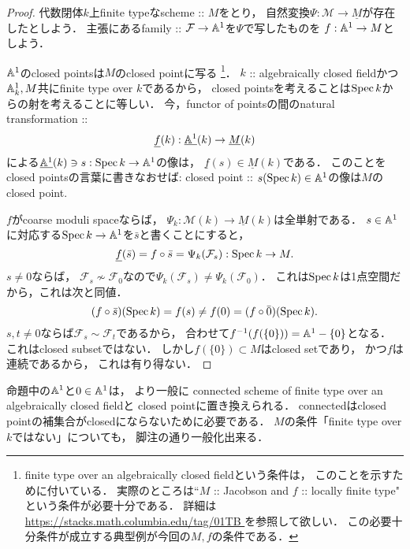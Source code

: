 \documentclass[a4paper]{jsarticle}
\newcommand{\famF}{\mathcal{F}}
\newcommand{\ftor}[1]{\underline{#1}}
\newcommand{\ftorM}{\mathcal{M}}
\begin{document}
    \begin{proof}
        代数閉体$k$上finite typeなscheme :: $M$をとり，
        自然変換$\Psi: \ftorM \to \ftor{M}$が存在したとしよう．
        主張にあるfamily :: $\famF \to \affine^1$を$\Psi$で写したものを
        $f: \mathbb{A}^1 \to M$としよう．

        $\mathbb{A}^1$のclosed pointsは$M$のclosed pointに写る
        \footnote
        {
            finite type over an algebraically closed fieldという条件は，
            このことを示すために付いている．
            実際のところは``$M$ :: Jacobson and $f$ :: locally finite type"
            という条件が必要十分である．
            詳細は\url{ https://stacks.math.columbia.edu/tag/01TB }を参照して欲しい．
            この必要十分条件が成立する典型例が今回の$M,f$の条件である．
        }．
        $k$ :: algebraically closed fieldかつ
        $\mathbb{A}_k^1, M$共にfinite type over $k$であるから，
        closed pointsを考えることは$\operatorname{Spec} k$からの射を考えることに等しい．
        今，functor of pointsの間のnatural transformation :: 
        \[ \ftor{f}(k): \ftor{\affine^1}(k) \to \ftor{M}(k) \]
        による$\ftor{\affine^1}(k) \ni s: \Spec k \to \affine^1$の像は，
        $\ftor{f}(s) \in \ftor{M}(k)$である．
        このことをclosed pointsの言葉に書きなおせば:
        closed point :: $s(\operatorname{Spec} k) \in \mathbb{A}^1$の像は$M$のclosed point.
        
        $f$がcoarse moduli spaceならば，
        $\Psi_k: \ftorM(k) \to \ftor{M}(k)$は全単射である．
        $s \in \mathbb{A}^1$に対応する$\operatorname{Spec} k \to \mathbb{A}^1$を$\bar{s}$と書くことにすると，
        \[ \ftor{f}(\bar{s})=f \circ \bar{s}=\Psi_k(\famF_s): \Spec k \to M. \]
        $s \neq 0$ならば，
        $\famF_s \not \sim \famF_0$なので$\Psi_k(\famF_s) \neq \Psi_k(\famF_0)$．
        これは$\operatorname{Spec} k$は1点空間だから，これは次と同値．
        \[ (f \circ \bar{s})(\operatorname{Spec} k)=f(s) \neq f(0)=(f \circ \bar{0})(\operatorname{Spec} k). \]
        $s, t \neq 0$ならば$\famF_s \sim \famF_t$であるから，
        合わせて$f^{-1}(f(\{0\}))=\mathbb{A}^1-\{0\}$となる．
        これはclosed subsetではない．
        しかし$f(\{0\}) \subset M$はclosed setであり，
        かつ$f$は連続であるから，
        これは有り得ない．
    \end{proof}
    \begin{Remark}
        命題中の$\mathbb{A}^1$と$0 \in \mathbb{A}^1$は，
        より一般に
        connected scheme of finite type over an algebraically closed fieldと
        closed pointに置き換えられる．
        connectedはclosed pointの補集合がclosedにならないために必要である．
        $M$の条件「finite type over $k$ではない」についても，
        脚注の通り一般化出来る．
    \end{Remark}
\end{document}
